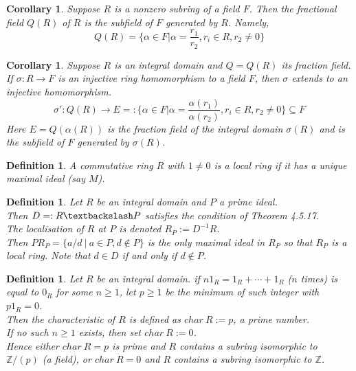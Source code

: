 \documentclass[a4paper,8pt]{article}
\newcommand{\Z}{\mathbb{Z}}
\newcommand{\hlt}[1]{\textit{{\color{blue}#1}}}
\theoremstyle{theorem}
\newtheorem{corollary}[theorem]{Corollary}
\newtheorem{definition}[theorem]{Definition}
\begin{document}
\begin{corollary}
Suppose $R$ is a nonzero subring of a field $F$. Then the fractional field $Q(R)$ of $R$ is the subfield of $F$ generated by $R$. Namely, 
\begin{equation}
Q(R) = \{\alpha \in F | \alpha = \frac{r_1}{r_2}, r_i \in R, r_2 \neq 0\} \nonumber
\end{equation}
\end{corollary}

\begin{corollary}
Suppose $R$ is an integral domain and $Q = Q(R)$ its fraction field. If $\sigma: R \rightarrow F$ is an injective ring homomorphism to a field $F$, then $\sigma$ extends to an injective homomorphism.
\begin{equation}
\sigma ' : Q(R) \rightarrow E =: \{\alpha \in F | \alpha = \frac{\alpha(r_1)}{\alpha(r_2)}, r_i \in R, r_2 \neq 0\} \subseteq F \nonumber
\end{equation}
Here $E=Q(\alpha(R))$ is the fraction field of the integral domain $\sigma(R)$ and is the subfield of $F$ generated by $\sigma(R)$.
\end{corollary}

\begin{definition}
A commutative ring $R$ with $1 \neq 0$ is a \hlt{local ring} if it has a unique maximal ideal (say $M$).
\end{definition}

\begin{definition}
Let $R$ be an integral domain and $P$ a prime ideal.\\
Then $D =:R \textbackslash P$ satisfies the condition of Theorem 4.5.17.\\
The \hlt{localisation of $R$ at $P$} is denoted $R_P := D^{-1}R$.\\
Then $PR_P = \{a/d \ | \ a\in P, d \notin P\}$ is the only maximal ideal in $R_P$ so that $R_P$ is a local ring. Note that $d \in D$ if and only if $d \notin P$.
\end{definition}

\begin{definition}
Let $R$ be an integral domain. if $n 1_R = 1_R + \cdots + 1_R$ ($n$ times) is equal to $0_R$ for some $n \geq 1$, let $p \geq 1$ be the minimum of such integer with $p1_R = 0$.\\
Then the \hlt{characteristic of $R$} is defined as $char \ R := p$, a prime number.\\
If no such $n \geq 1$ exists, then set $char \ R := 0$.\\
Hence either $char \ R = p$ is prime and $R$ contains a subring isomorphic to $\Z /(p)$ (a field), or $char \ R = 0$ and $R$ contains a subring isomorphic to $\Z$.
\end{definition}
\end{document}
